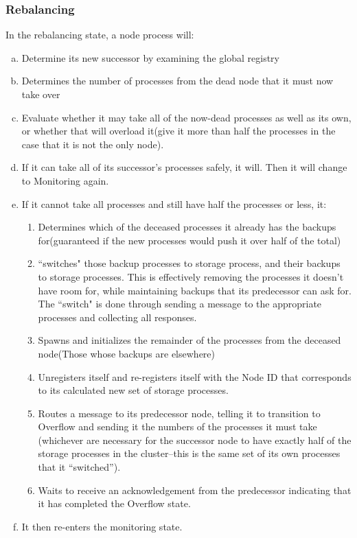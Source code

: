 \documentclass[a4paper]{article}
\begin{document}
\subsubsection{Rebalancing}

In the rebalancing state, a node process will:
\begin{enumerate}[a.]
\item Determine its new successor by examining the global registry
\item Determines the number of processes from the dead node that it must now take over
\item Evaluate whether it may take all of the now-dead processes as well as its own, or whether that will overload it(give it more than half the processes in the case that it is not the only node).
\item If it can take all of its successor's processes safely, it will. Then it will change to Monitoring again.
\item If it cannot take all processes and still have half the processes or less, it:
\begin{enumerate}
\item Determines which of the deceased processes it already has the backups for(guaranteed if the new processes would push it over half of the total)
\item ``switches" those backup processes to storage process, and their backups to storage processes. This is effectively removing the processes it doesn't have room for, while maintaining backups that its predecessor can ask for. The ``switch" is done through sending a message to the appropriate processes and collecting all responses.
\item Spawns and initializes the remainder of the processes from the deceased node(Those whose backups are elsewhere)
\item Unregisters itself and re-registers itself with the Node ID that corresponds to its calculated new set of storage processes.
\item Routes a message to its predecessor node, telling it to transition to Overflow and sending it the numbers of the processes it must take (whichever are necessary for the successor node to have exactly half of the storage processes in the cluster--this is the same set of its own processes that it ``switched'').
\item Waits to receive an acknowledgement from the predecessor indicating that it has completed the Overflow state.
\end{enumerate}
\item It then re-enters the monitoring state.
\end{enumerate}
\end{document}

